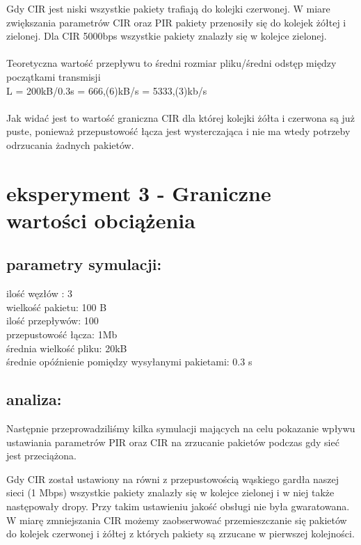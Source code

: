 \documentclass[a4paper]{article}
\begin{document}
Gdy CIR jest niski wszystkie pakiety trafiają do kolejki czerwonej. W miare zwiększania parametrów CIR oraz PIR pakiety przenosiły się do kolejek żółtej i zielonej. Dla CIR 5000bps wszystkie pakiety znalazły się w kolejce zielonej.\\
\\

Teoretyczna wartość przepływu to średni rozmiar pliku/średni odstęp między początkami transmisji\\
L = 200kB/0.3s = 666,(6)kB/s = 5333,(3)kb/s\\
\\

Jak widać jest to wartość graniczna CIR dla której kolejki żółta i czerwona są już puste, ponieważ przepustowość łącza jest wysterczająca i nie ma wtedy potrzeby odrzucania żadnych pakietów.

\section{eksperyment 3 - Graniczne wartości obciążenia}


\subsection{parametry symulacji:}

 
ilość węzłów : 3\\
wielkość pakietu: 100 B\\
ilość przepływów: 100\\
przepustowość łącza: 1Mb\\
średnia wielkość pliku: 20kB\\
średnie opóźnienie pomiędzy wysyłanymi pakietami: 0.3 s\\

\subsection{analiza:}


Następnie przeprowadziliśmy kilka symulacji mających na celu pokazanie wpływu ustawiania parametrów PIR oraz CIR na zrzucanie pakietów podczas gdy sieć jest przeciążona.

Gdy CIR został ustawiony na równi z przepustowością wąskiego gardła naszej sieci (1 Mbps) wszystkie pakiety znalazły się w kolejce zielonej i w niej także następowały dropy. Przy takim ustawieniu jakość obsługi nie była gwaratowana.
W miarę zmniejszania CIR możemy zaobserwować przemieszczanie się pakietów do kolejek czerwonej i żółtej z których pakiety są zrzucane w pierwszej kolejności.
\end{document}
